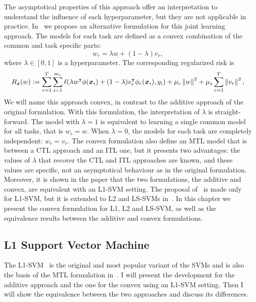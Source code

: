 The asymptotical properties of this approach offer an interpretation to understand the influence of each hyperparameter, but they are not applicable in practice.
In~\cite{RuizAD19} we propose an alternative formulation for this joint learning approach. The models for each task are defined as a convex combination of the common and task specific parts:
\begin{equation}
    \nonumber
    {w}_r = \lambda {w} + (1 - \lambda) {v}_r,
\end{equation}
where $\lambda \in \left[0, 1\right]$ is a hyperparameter.
The corresponding regularized risk is 
\begin{equation}
    \nonumber
    R_{\bm{z}} ({w}) \vcentcolon= \sum_{r=1}^{T} \sum_{i=1}^{m_r} \ell(\lambda {w}^\intercal {\phi(\bm{x}_i)} + (1 - \lambda) {v}_r^\intercal {\phi_r(\bm{x}_i)}, y_i) + \mu_c \left\lVert{w}\right\rVert^2 + \mu_s \sum_{r=1}^T \left\lVert{v}_r\right\rVert^2,
\end{equation}
We will name this approach {convex}, in contrast to the {additive} approach of the original formulation.
With this formulation, the interpretation of $\lambda$ is straight-forward. The model with $\lambda = 1$ is equivalent to learning a single common model for all tasks, that is ${w}_r = {w}$. When $\lambda=0$, the models for each task are completely independent: ${w}_r = {v}_r$.
The convex formulation also define an MTL model that is between a CTL approach and an ITL one, but it presents two advantages: the values of $\lambda$ that recover the CTL and ITL approaches are known, and these values are specific, not an asymptotical behaviour as in the original formulation. 
%
Moreover, it is shown in the paper that the two formulations, the {additive} and {convex}, are equivalent with an L1-SVM setting.
%
The proposal of~\cite{RuizAD19} is made only for L1-SVM, but it is extended to L2 and LS-SVMs in~\cite{RuizAD21}. In this chapter we present the convex formulation for L1, L2 and LS-SVM, as well as the equivalence results between the {additive} and {convex} formulations.




\subsection{L1 Support Vector Machine}
The L1-SVM~\cite{Vapnik00} is the original and most popular variant of the SVMs and is also the basis of the MTL formulation in~\cite{EvgeniouP04}.
I will present the development for the {additive} approach and the one for the {convex} using an L1-SVM setting. Then I will show the equivalence between the two approaches and discuss its differences.


